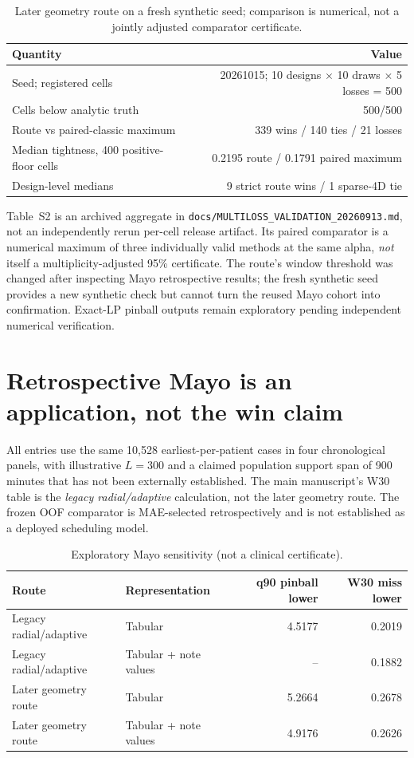 \documentclass[10pt]{article}
\begin{document}
\begin{table}[h]
\centering\small
\caption{Later geometry route on a fresh synthetic seed; comparison is numerical, not a jointly adjusted comparator certificate.}
\begin{tabular}{lr}
\toprule
Quantity & Value \\
\midrule
Seed; registered cells & 20261015; 10 designs $\times$ 10 draws $\times$ 5 losses = 500 \\
Cells below analytic truth & 500/500 \\
Route vs paired-classic maximum & 339 wins / 140 ties / 21 losses \\
Median tightness, 400 positive-floor cells & 0.2195 route / 0.1791 paired maximum \\
Design-level medians & 9 strict route wins / 1 sparse-4D tie \\
\bottomrule
\end{tabular}
\end{table}

Table~S2 is an archived aggregate in \texttt{docs/MULTILOSS\_VALIDATION\_20260913.md}, not an independently rerun per-cell release artifact. Its paired comparator is a numerical maximum of three individually valid methods at the same alpha, \emph{not} itself a multiplicity-adjusted 95\% certificate. The route's window threshold was changed after inspecting Mayo retrospective results; the fresh synthetic seed provides a new synthetic check but cannot turn the reused Mayo cohort into confirmation. Exact-LP pinball outputs remain exploratory pending independent numerical verification.

\section{Retrospective Mayo is an application, not the win claim}
All entries use the same 10,528 earliest-per-patient cases in four chronological panels, with illustrative $L=300$ and a claimed population support span of 900 minutes that has not been externally established. The main manuscript's W30 table is the \emph{legacy radial/adaptive} calculation, not the later geometry route. The frozen OOF comparator is MAE-selected retrospectively and is not established as a deployed scheduling model.

\begin{table}[h]
\centering\small
\caption{Exploratory Mayo sensitivity (not a clinical certificate).}
\begin{tabular}{llrr}
\toprule
Route & Representation & q90 pinball lower & W30 miss lower \\
\midrule
Legacy radial/adaptive & Tabular & 4.5177 & 0.2019 \\
Legacy radial/adaptive & Tabular + note values & -- & 0.1882 \\
Later geometry route & Tabular & 5.2664 & 0.2678 \\
Later geometry route & Tabular + note values & 4.9176 & 0.2626 \\
\bottomrule
\end{tabular}
\end{table}
\end{document}
